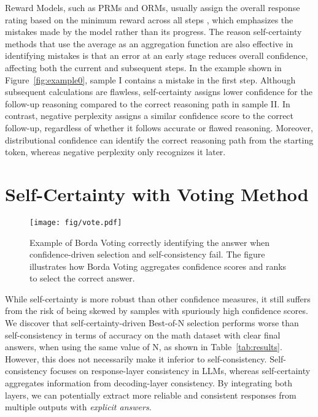 Reward Models, such as PRMs and ORMs, usually assign the overall response rating based on the minimum reward across all steps \cite{lightman2023let,wang2024math}, which emphasizes the mistakes made by the model rather than its progress. The reason self-certainty methods that use the average as an aggregation function are also effective in identifying mistakes is that an error at an early stage reduces overall confidence, affecting both the current and subsequent steps. In the example shown in Figure~\ref{fig:example0}, sample I contains a mistake in the first step. Although subsequent calculations are flawless, self-certainty assigns lower confidence for the follow-up reasoning compared to the correct reasoning path in sample II. In contrast, negative perplexity assigns a similar confidence score to the correct follow-up, regardless of whether it follows accurate or flawed reasoning. Moreover, distributional confidence can identify the correct reasoning path from the starting token, whereas negative perplexity only recognizes it later.

\section{Self-Certainty with Voting Method}\label{sec:vote}
\begin{figure*}[htbp]
    \centering
    \texttt{[image: fig/vote.pdf]}
    \vspace{-1.em}
    \caption{Example of Borda Voting correctly identifying the answer when confidence-driven selection and self-consistency fail. The figure illustrates how Borda Voting aggregates confidence scores and ranks to select the correct answer.}
    \label{fig:example1}
\end{figure*}
While self-certainty is more robust than other confidence measures, it still suffers from the risk of being skewed by samples with spuriously high confidence scores. We discover that self-certainty-driven Best-of-N selection performs worse than self-consistency in terms of accuracy on the math dataset with clear final answers, when using the same value of N, as shown in Table~\ref{tab:results}. However, this does not necessarily make it inferior to self-consistency. Self-consistency focuses on response-layer consistency in LLMs, whereas self-certainty aggregates information from decoding-layer consistency. By integrating both layers, we can potentially extract more reliable and consistent responses from multiple outputs with \emph{explicit answers}.

